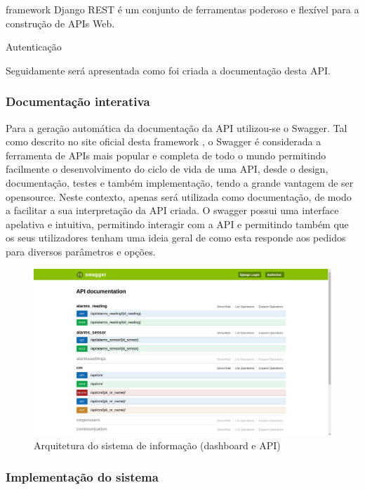 framework Django REST é um conjunto de ferramentas poderoso e flexível para a construção de APIs Web.




Autenticação


Seguidamente será apresentada como foi criada a documentação desta API. 

\newpage
\subsubsection{Documentação interativa}


Para a geração automática da documentação da API utilizou-se o Swagger. Tal como descrito no site oficial desta framework \cite{SmartBearSoftware2017}, o Swagger é considerada a ferramenta de APIs mais popular e completa de todo o mundo permitindo facilmente o desenvolvimento do ciclo de vida de uma API, desde o design, documentação, testes e também implementação, tendo a grande vantagem de ser opensource. Neste contexto, apenas será utilizada como documentação, de modo a facilitar a sua interpretação da API criada. O swagger possui uma interface apelativa e intuitiva, 
permitindo interagir com a API e permitindo também que os seus utilizadores tenham uma ideia geral de como esta responde aos pedidos para diversos parâmetros e opções. 


\begin{figure}[h]
	\centering
	\includegraphics[width=\linewidth]{prints-web/api-doc.png}
	\caption{Arquitetura do sistema de informação (dashboard e API)}
	\label{docapi}
\end{figure}



\subsubsection{Implementação do sistema}

